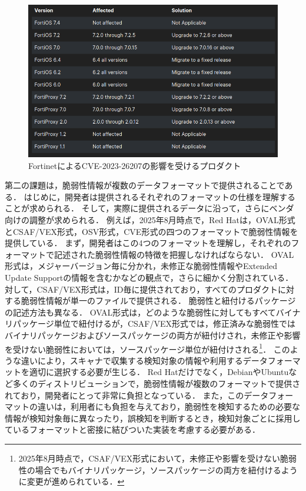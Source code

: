 \begin{figure}[htbp]
    \begin{center}
        \includegraphics[scale=0.3]{./1-introduction/cve-2023-26207-fortinet.png}
        \caption{FortinetによるCVE-2023-26207の影響を受けるプロダクト\cite{cve-2023-26207-fortinet}}
        \label{fig:cve-2023-26207-fortinet}
    \end{center}
\end{figure}

第二の課題は，脆弱性情報が複数のデータフォーマットで提供されることである．
はじめに，開発者は提供されるそれぞれのフォーマットの仕様を理解することが求められる．
そして，実際に提供されるデータに沿って，さらにベンダ向けの調整が求められる．
例えば，2025年8月時点で，Red Hatは，OVAL形式\cite{redhat-ovalv2}とCSAF/VEX形式\cite{redhat-vex}，OSV形式\cite{redhat-osv}，CVE形式\cite{redhat-cve}の四つのフォーマットで脆弱性情報を提供している．
まず，開発者はこの4つのフォーマットを理解し，それぞれのフォーマットで記述された脆弱性情報の特徴を把握しなければならない．
OVAL形式は，メジャーバージョン毎に分かれ，未修正な脆弱性情報やExtended Update Supportの情報を含むかなどの観点で，さらに細かく分割されている．
対して，CSAF/VEX形式は，ID毎に提供されており，すべてのプロダクトに対する脆弱性情報が単一のファイルで提供される．
脆弱性と紐付けるパッケージの記述方法も異なる．
OVAL形式は，どのような脆弱性に対してもすべてバイナリパッケージ単位で紐付けるが，CSAF/VEX形式では，修正済みな脆弱性ではバイナリパッケージおよびソースパッケージの両方が紐付けされ，未修正や影響を受けない脆弱性においては，ソースパッケージ単位が紐付けされる\footnote{2025年8月時点で，CSAF/VEX形式において，未修正や影響を受けない脆弱性の場合でもバイナリパッケージ，ソースパッケージの両方を紐付けるように変更が進められている\cite{redhat-secdata-1097}．}．
このような違いにより，スキャナで収集する検知対象の情報や利用するデータフォーマットを適切に選択する必要が生じる．
Red Hatだけでなく，DebianやUbuntuなど多くのディストリビューションで，脆弱性情報が複数のフォーマットで提供されており，開発者にとって非常に負担となっている．
また，このデータフォーマットの違いは，利用者にも負担を与えており，脆弱性を検知するための必要な情報が検知対象毎に異なったり，誤検知を判断するとき，検知対象ごとに採用しているフォーマットと密接に結びついた実装を考慮する必要がある．

